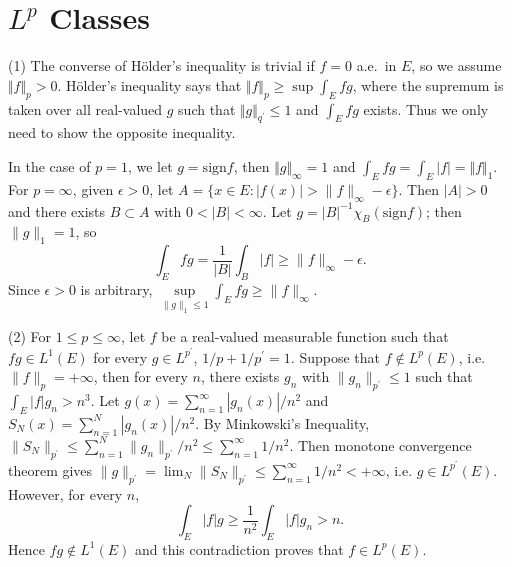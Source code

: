 \section{$L^p$ Classes}

\begin{exercise}{8.2}
(1)	The converse of H\"older's inequality is trivial if $f=0$ a.e.\ in $E$, so we assume $\Vert f\Vert_p>0$. 
	H\"older's inequality says that $\Vert f\Vert_p\geq \sup \int_Efg$,
	where the supremum is taken over all real-valued $g$ such that $\Vert g\Vert_{q^\prime}\leq 1$ and $\int_E fg$ exists. Thus we only need to show the opposite inequality. 
	
	In the case of $p=1$, we let $g=\mathrm{sign} f$, then $\Vert g\Vert_\infty=1$ and $\int_Efg=\int_E|f|=\Vert f\Vert_1$.
For $p=\infty$, given $\epsilon>0$, let $A=\{x\in E:|f(x)|>\|f\|_\infty-\epsilon\}$. Then $|A|>0$ and there exists $B\subset A$ with $0<|B|<\infty$. Let $g=|B|^{-1}\chi_B(\mathrm{sign} f)$; then $\|g\|_1=1$, so
$$\int_Efg=\frac{1}{|B|}\int_B|f|\geq\|f\|_\infty-\epsilon.$$
Since $\epsilon>0$ is arbitrary, $\underset{{\|g\|_1\leq1}}{\sup}\int_Efg\geq\|f\|_\infty$.

(2) For $1\leq p\leq\infty$, let $f$ be a real-valued measurable function such that
$fg\in L^1(E)$ for every $g\in L^{p^{\prime}}$, $1/p+1/p^{\prime}=1$. Suppose that $f\not\in L^p(E)$, i.e. $\|f\|_p=+\infty$, then for every $n$, there exists $g_n$ with $\|g_n\|_{p^{\prime}}\leq1$ such that $\int_E|f|g_n>n^3$. Let $g(x)=\sum_{n=1}^{\infty}|g_n(x)|/n^2$ and $S_N(x)=\sum_{n=1}^{N}|g_n(x)|/n^2$. By Minkowski's Inequality, $\|S_N\|_{p^{\prime}}\leq\sum_{n=1}^N\|g_n\|_{p^\prime}/n^2\leq\sum_{n=1}^\infty1/n^2$. Then monotone convergence theorem gives $\|g\|_{p^\prime}=\lim_N\|S_N\|_{p^\prime}\leq\sum_{n=1}^\infty1/n^2<+\infty$, i.e. $g\in L^{p^\prime}(E)$. However, for every $n$,  $$\int_E|f|g\geq\frac{1}{n^2}\int_E|f|g_n> n.$$
Hence $fg\not\in L^1(E)$ and this contradiction proves that $f\in  L^p(E)$. 
\end{exercise}
